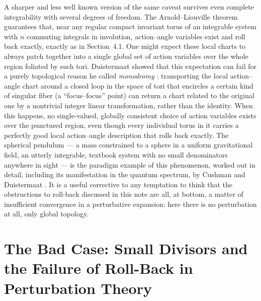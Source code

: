 \documentclass[11pt]{article}
\begin{document}
A sharper and less well known version of the same caveat survives even complete integrability with several degrees of freedom. The Arnold--Liouville theorem \cite{Arnold1989} guarantees that, near any regular compact invariant torus of an integrable system with $n$ commuting integrals in involution, action--angle variables exist and roll back exactly, exactly as in Section~4.1. One might expect these local charts to always patch together into a single global set of action variables over the whole region foliated by such tori. Duistermaat showed that this expectation can fail for a purely topological reason he called \emph{monodromy} \cite{Duistermaat1980}: transporting the local action--angle chart around a closed loop in the space of tori that encircles a certain kind of singular fiber (a ``focus--focus'' point) can return a chart related to the original one by a nontrivial integer linear transformation, rather than the identity. When this happens, no single-valued, globally consistent choice of action variables exists over the punctured region, even though every individual torus in it carries a perfectly good local action--angle description that rolls back exactly. The spherical pendulum --- a mass constrained to a sphere in a uniform gravitational field, an utterly integrable, textbook system with no small denominators anywhere in sight --- is the paradigm example of this phenomenon, worked out in detail, including its manifestation in the quantum spectrum, by Cushman and Duistermaat \cite{CushmanDuistermaat1988}. It is a useful corrective to any temptation to think that the obstructions to roll-back discussed in this note are all, at bottom, a matter of insufficient convergence in a perturbative expansion: here there is no perturbation at all, only global topology.

\section{The Bad Case: Small Divisors and the Failure of Roll-Back in Perturbation Theory}
\end{document}
